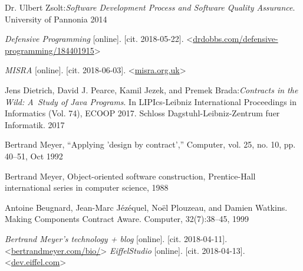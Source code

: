 \begin{thebibliography}{99}

 Dr. Ulbert Zsolt:\emph{Software Development Process and Software Quality Assurance}. University of Pannonia 2014

 {\it Defensive Programming} [online]. [cit. 2018-05-22]. \textless\url{drdobbs.com/defensive-programming/184401915}\textgreater

 {\it MISRA} [online]. [cit. 2018-06-03]. \textless\url{misra.org.uk}\textgreater


 Jens Dietrich, David J. Pearce, Kamil Jezek, and Premek Brada:\emph{Contracts in the Wild: A~Study of Java Programs}. In LIPIcs-Leibniz International Proceedings in Informatics (Vol. 74), ECOOP 2017. Schloss Dagstuhl-Leibniz-Zentrum fuer Informatik. 2017

 Bertrand Meyer, “Applying ’design by contract’,” Computer, vol. 25, no. 10, pp. 40–51, Oct 1992

 Bertrand Meyer, Object-oriented software construction, Prentice-Hall international series in computer science, 1988 

 Antoine Beugnard, Jean-Marc Jézéquel, Noël Plouzeau, and Damien Watkins. Making Components Contract Aware. Computer, 32(7):38–45, 1999


 {\it Bertrand Meyer's technology + blog} [online]. [cit. 2018-04-11]. \textless\url{bertrandmeyer.com/bio/}\textgreater
{} {\it EiffelStudio} [online]. [cit. 2018-04-13]. \textless\url{dev.eiffel.com}\textgreater


\end{thebibliography}
